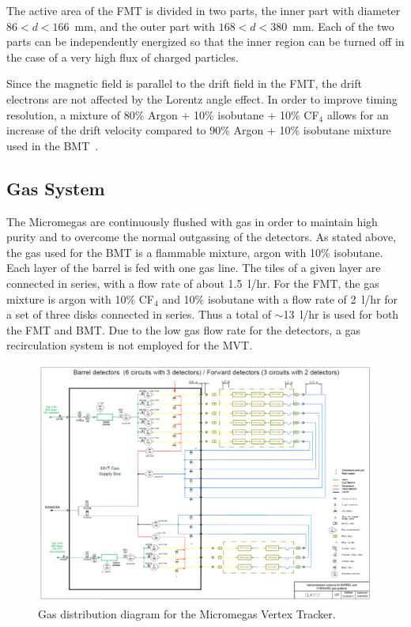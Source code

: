 The active area of the FMT is divided in two parts, the inner part with diameter $86 < d < 166$~mm, and the outer part with
$168 < d < 380$~mm. Each of the two parts can be independently energized so that the inner region can be turned off in the
case of a very high flux of charged particles.

Since the magnetic field is parallel to the drift field in the FMT, the drift electrons are not affected by the Lorentz angle
effect. In order to improve timing resolution, a mixture of 80\% Argon + 10\% isobutane + 10\% CF$_4$ allows for an increase
of the drift velocity compared to 90\% Argon + 10\% isobutane mixture used in the BMT~\cite{GAS}. 

\subsection{Gas System}

The Micromegas are continuously flushed with gas in order to maintain high purity and to overcome the normal outgassing of the
detectors. As stated above, the gas used for the BMT is a flammable mixture, argon with 10\% isobutane. Each layer of the
barrel is fed with one gas line. The tiles of a given layer are connected in series, with a flow rate of about 1.5~l/hr. For the FMT,
the gas mixture is argon with 10\% CF$_4$ and 10\% isobutane with a flow rate of 2~l/hr for a set of three disks connected
in series. Thus a total of $\sim$13~l/hr is used for both the FMT and BMT. Due to the low gas flow rate for the detectors, a gas
recirculation system is not employed for the MVT. 

\begin{figure}[htb]
\includegraphics[width=2\columnwidth,keepaspectratio]{images/gas_system}
 \caption{Gas distribution diagram for the Micromegas Vertex Tracker.}
 \label{fig:mm-gas-sys}
\end{figure}

